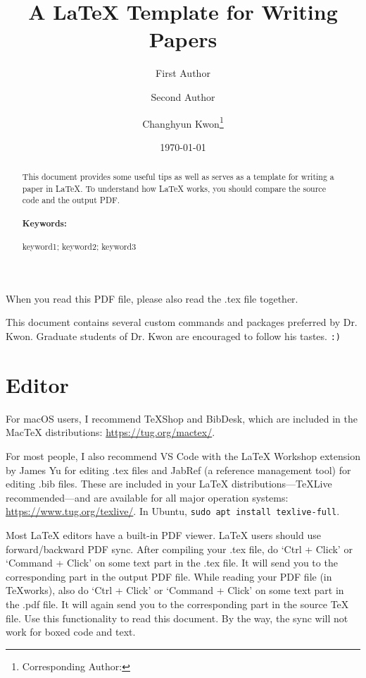 \documentclass[letterpaper, 11pt]{article}
\title{A LaTeX Template for Writing Papers}
\author[1]{First Author}
\author[2]{Second Author}
\author[3]{Changhyun Kwon\footnote{Corresponding Author: \email{chkwon@kaist.ac.kr}}}
\affil[1]{Department of First Engineering, First University}
\affil[2]{Department of Second Engineering, First University}
\affil[3]{Department of Industrial and Systems Engineering, KAIST, Daejeon, 34141, Republic of Korea}
\date{\today}
\newcommand{\bluenote}[1]{{\Large\color{blue}#1}}
\newcommand{\rednote}[1]{{\Large\color{red}#1}}
\begin{document}
\maketitle

\begin{abstract}
This document provides some useful tips as well as serves as a template for writing a paper in LaTeX.
To understand how LaTeX works, you should compare the source code and the output PDF.

\paragraph{Keywords:} keyword1; keyword2; keyword3
\end{abstract}



\rednote{When you read this PDF file, please also read the .tex file together.}

\bluenote{This document contains several custom commands and packages preferred by Dr. Kwon.
Graduate students of Dr. Kwon are encouraged to follow his tastes. \texttt{:)}}


\section{Editor} \label{sec:editor}

For macOS users, I recommend TeXShop and BibDesk, which are included in the MacTeX distributions: \url{https://tug.org/mactex/}.

For most people, I also recommend VS Code with the LaTeX Workshop extension by James Yu for editing .tex files and JabRef (a reference management tool) for editing .bib files. These are included in your LaTeX distributions---TeXLive recommended---and are available for all major operation systems: \url{https://www.tug.org/texlive/}.
In Ubuntu, \texttt{sudo apt install texlive-full}.

Most LaTeX editors have a built-in PDF viewer.
LaTeX users should use forward/backward PDF sync.
After compiling your .tex file, do `Ctrl + Click' or `Command + Click' on some text part in the .tex file.
It will send you to the corresponding part in the output PDF file.
While reading your PDF file (in TeXworks), also do `Ctrl + Click' or `Command + Click' on some text part in the .pdf file.
It will again send you to the corresponding part in the source TeX file.
Use this functionality to read this document.
By the way, the sync will not work for boxed code and text.
\end{document}
